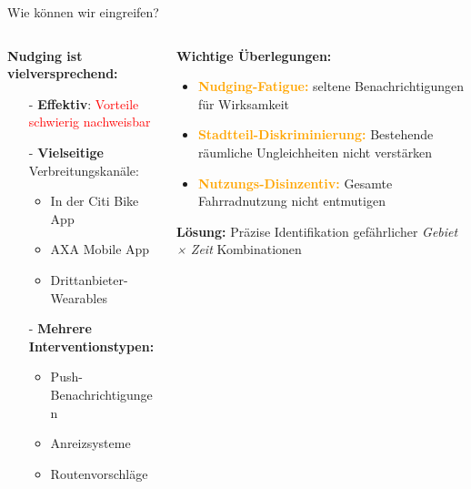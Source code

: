 \documentclass[aspectratio=169,xcolor={usenames,dvipsnames,svgnames,table},10pt,usepdftitle=false,hyperref={bookmarksdepth=3}]{beamer}
\begin{document}
\begin{frame}{Wie können wir eingreifen?}
    \begin{columns}
        \begin{column}{0.5\textwidth}
            \textbf{Nudging ist vielversprechend:}
            
            \begin{itemize}
                \item[-] \textbf{Effektiv}: \textcolor{red}{Vorteile schwierig nachweisbar}
                \item[-] \textbf{Vielseitige} Verbreitungskanäle:
                \begin{itemize}
                    \item In der Citi Bike App
                    \item AXA Mobile App
                    \item Drittanbieter-Wearables
                \end{itemize}
                \item[-] \textbf{Mehrere Interventionstypen:}
                \begin{itemize}
                    \item Push-Benachrichtigungen
                    \item Anreizsysteme
                    \item Routenvorschläge
                \end{itemize}
            \end{itemize}
        \end{column}
        
        \begin{column}{0.5\textwidth}
            \textbf{Wichtige Überlegungen:}
            \begin{itemize}
                \item \textcolor{orange}{\textbf{Nudging-Fatigue:}} seltene Benachrichtigungen für Wirksamkeit
                \item \textcolor{orange}{\textbf{Stadtteil-Diskriminierung:}} Bestehende räumliche Ungleichheiten nicht verstärken
                \item \textcolor{orange}{\textbf{Nutzungs-Disinzentiv:}} Gesamte Fahrradnutzung nicht entmutigen
            \end{itemize}
            
            \vspace{0.3cm}
            
            \textbf{Lösung:} Präzise Identifikation gefährlicher \textit{Gebiet × Zeit} Kombinationen
        \end{column}
    \end{columns}
\end{frame}
\end{document}
